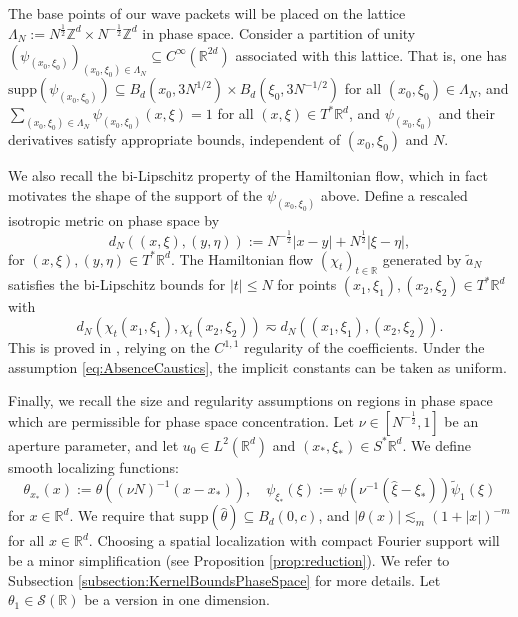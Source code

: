 \documentclass{amsart}
\numberwithin{equation}{section}
\theoremstyle{definition}
\newcommand{\R}{\mathbb{R}}
\newcommand{\Rd}{\mathbb{R}^{d}}
\newcommand{\Z}{\mathbb{Z}}
\newcommand {\Sp}{S^{*}\Rd}
\newcommand {\supp}{\mathrm{supp}}
\newcommand {\Tp}{T^{*}\Rd}
\begin{document}
The base points of our wave packets will be placed on the lattice $\Lambda_N:= N^{\frac{1}{2}} \Z^d \times N^{-\frac{1}{2}} \Z^d$ in phase space. Consider a partition of unity $(\psi_{(x_0,\xi_0)})_{(x_0,\xi_0) \in \Lambda_N}\subseteq C^{\infty}(\R^{2d})$ associated with this %
lattice. %
That is, one has $\supp(\psi_{(x_{0},\xi_{0})})\subseteq B_{d}(x_{0},3N^{1/2})\times B_{d}(\xi_{0},3N^{-1/2})$ for all $(x_{0},\xi_{0})\in\Lambda_{N}$, and
$\sum_{(x_0,\xi_0) \in \Lambda_N} \psi_{(x_0,\xi_0)}(x,\xi)= 1$ 
for all $(x,\xi)\in\Tp$, and $\psi_{(x_{0},\xi_{0})}$ and their derivatives satisfy appropriate bounds, independent of $(x_{0},\xi_{0})$ and $N$.

We also recall the bi-Lipschitz property of the Hamiltonian flow, which in fact motivates the shape of the support of the $\psi_{(x_{0},\xi_{0})}$ above. %
Define a rescaled isotropic metric on phase space by
\begin{equation*}
    d_N((x,\xi),(y,\eta)):= N^{-\frac{1}{2}}|x-y| + N^{\frac{1}{2}} |\xi-\eta|,
\end{equation*}
for $(x,\xi),(y,\eta)\in T^{*}\Rd$. The Hamiltonian flow $(\chi_t)_{t \in \R}$ generated by $\tilde{a}_N$ satisfies the bi-Lipschitz bounds for $|t| \leq N$ for points $(x_{1},\xi_{1}),(x_2,\xi_2) \in T^* \R^d$ with%
\begin{equation*}
    d_N(\chi_t(x_1,\xi_1),\chi_t(x_2,\xi_2)) \eqsim d_N((x_1,\xi_1),(x_2,\xi_2)).
\end{equation*}
This is proved in \cite[Lemma~2.2]{SchippaTataru2025}, relying on the $C^{1,1}$ regularity of the coefficients. Under the assumption \eqref{eq:AbsenceCaustics}, the implicit constants can be taken as uniform.

Finally, we recall the size and regularity assumptions on regions in phase space which are permissible for phase space concentration.
Let $\nu \in [N^{-\frac{1}{2}},1]$ be an aperture parameter, and %
let $u_0 \in L^2(\R^d)$ and $(x_*,\xi_{*}) \in \Sp$. We define smooth localizing functions: 
\begin{equation*}
    \theta_{x_*}(x):= \theta((\nu N)^{-1}(x-x_*)), \quad \psi_{\xi_*}(\xi):= \psi( \nu^{-1}( \hat{\xi} - \xi_*)) \tilde{\psi}_1(\xi)
\end{equation*} 
for $x\in\Rd$. We require that $\supp(\widehat{\theta}) \subseteq B_d(0,c)$, and $|\theta(x)| \lesssim_{m} (1+|x|)^{-m}$ for all $x\in\Rd$. Choosing a spatial localization with compact Fourier support will be a minor simplification (see Proposition \ref{prop:reduction}). We refer to Subsection \ref{subsection:KernelBoundsPhaseSpace} for more details. Let $\theta_1 \in \mathcal{S}(\R)$ be a version in one dimension.
\end{document}
